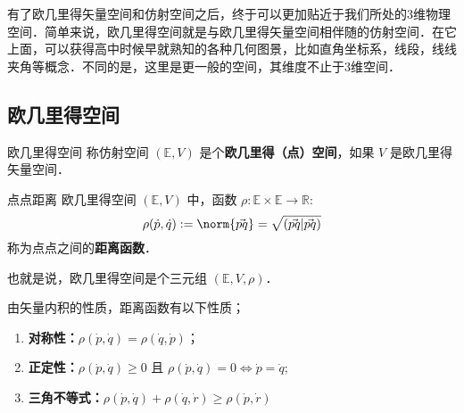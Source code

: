 有了欧几里得矢量空间和仿射空间之后，终于可以更加贴近于我们所处的3维物理空间．简单来说，欧几里得空间就是与欧几里得矢量空间相伴随的仿射空间．在它上面，可以获得高中时候早就熟知的各种几何图景，比如直角坐标系，线段，线线夹角等概念．不同的是，这里是更一般的空间，其维度不止于3维空间．
\subsection{欧几里得空间}
\begin{definition}{欧几里得空间}
称仿射空间 $(\mathbb E,V)$ 是个\textbf{欧几里得（点）空间}，如果 $V$ 是欧几里得矢量空间．
\end{definition}
\begin{definition}{点点距离}
欧几里得空间 $(\mathbb E,V)$ 中，函数 $\rho:\mathbb E\times\mathbb E\rightarrow\mathbb R$:
\begin{equation}
\rho(\dot p,\dot q):=\norm{\vec{pq}}=\sqrt{(\vec{pq}|\vec{pq})}
\end{equation}
称为点点之间的\textbf{距离函数}．
\end{definition}
也就是说，欧几里得空间是个三元组 $(\mathbb E,V,\rho)$．

由矢量内积的性质，距离函数有以下性质；
\begin{enumerate}
\item \textbf{对称性：}$\rho(\dot p,\dot q)=\rho(\dot q,\dot p)$；
\item \textbf{正定性：}$\rho(\dot p,\dot q)\geq 0$ 且 $\rho(\dot p,\dot q)= 0\Leftrightarrow\dot p=\dot q$;
\item \textbf{三角不等式：}$\rho(\dot p,\dot q)+\rho(\dot q,\dot r)\geq\rho(\dot p,\dot r)$
\end{enumerate}
